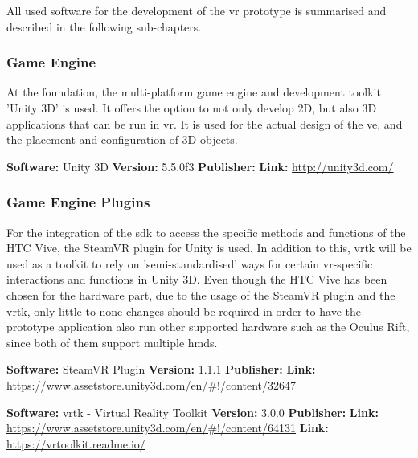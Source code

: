 All used software for the development of the \gls{vr} prototype is summarised and described in the following sub-chapters.


\subsubsection{Game Engine}
At the foundation, the multi-platform game engine and development toolkit 'Unity 3D' is used. It offers the option to not only develop 2D, but also 3D applications that can be run in \gls{vr}. It is used for the actual design of the \gls{ve}, and the placement and configuration of 3D objects.

\textbf{Software:} Unity 3D \newline
\textbf{Version:} 5.5.0f3 \newline
\textbf{Publisher:} \cite{Unity2016} \newline
\textbf{Link:} \url{http://unity3d.com/}


\subsubsection{Game Engine Plugins}
For the integration of the \gls{sdk} to access the specific methods and functions of the HTC Vive, the SteamVR plugin for Unity is used. In addition to this, \gls{vrtk} will be used as a toolkit to rely on 'semi-standardised' ways for certain \gls{vr}-specific interactions and functions in Unity 3D. Even though the HTC Vive has been chosen for the hardware part, due to the usage of the SteamVR plugin and the \gls{vrtk}, only little to none changes should be required in order to have the prototype application also run other supported hardware such as the Oculus Rift, since both of them support multiple \glspl{hmd}.

\textbf{Software:} SteamVR Plugin \newline
\textbf{Version:} 1.1.1 \newline
\textbf{Publisher:} \cite{Valve2016a} \newline
\textbf{Link:} \url{https://www.assetstore.unity3d.com/en/#!/content/32647}

\textbf{Software:} \gls{vrtk} - Virtual Reality Toolkit \newline
\textbf{Version:} 3.0.0 \newline
\textbf{Publisher:} \cite{Sysdia2017} \newline
\textbf{Link:} \url{https://www.assetstore.unity3d.com/en/#!/content/64131} \newline
\textbf{Link:} \url{https://vrtoolkit.readme.io/}


